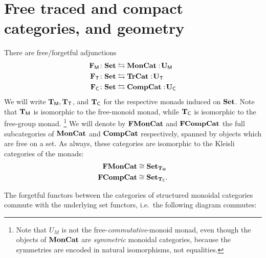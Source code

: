 \documentclass[12pt,oneside,article,draft]{memoir}
\begin{document}
\section{Free traced and compact categories, and geometry}\label{sec:free_and_geometry}

There are free/forgetful adjunctions
\begin{align*}
   \mathbf{F}_{\mathsf{M}}\colon\mathbf{Set} &\leftrightarrows\mathbf{MonCat}:\!\mathbf{U}_{\mathsf{M}} \\
   \mathbf{F}_{\mathsf{T}}\colon\mathbf{Set} &\leftrightarrows\mathbf{TrCat}:\!\mathbf{U}_{\mathsf{T}} \\
   \mathbf{F}_{\mathsf{C}}\colon\mathbf{Set} &\leftrightarrows\mathbf{CompCat}:\!\mathbf{U}_{\mathsf{C}}
\end{align*}
We will write $\mathbf{T}_{\mathsf{M}}, \mathbf{T}_{\mathsf{T}}$, and $\mathbf{T}_{\mathsf{C}}$ for the respective monads induced on $\mathbf{Set}$. Note that $\mathbf{T}_{\mathsf{M}}$ is
isomorphic to the free-monoid monad, while $\mathbf{T}_{\mathsf{C}}$ is isomorphic to the free-group monad.%
\footnote{Note that $U_M$ is not the free-\emph{commutative}-monoid monad, even though the objects of $\mathbf{MonCat}$ are \emph{symmetric} monoidal categories, because the symmetries are encoded in natural isomorphisms, not equalities.
}
We will denote by $\mathbf{FMonCat}$ and $\mathbf{FCompCat}$ the full subcategories of $\mathbf{MonCat}$ and $\mathbf{CompCat}$
respectively, spanned by objects which are free on a set. As always, these categories are isomorphic
to the Kleisli categories of the monads: 
\begin{align}\label{dia:TMvsFrMonCat}
\mathbf{FMonCat}&\cong\mathbf{Set}_{\mathbf{T}_{\mathsf{M}}}
\\\nonumber
\mathbf{FCompCat}&\cong\mathbf{Set}_{\mathbf{T}_{\mathsf{C}}}.
\end{align}

The forgetful functors between the categories of structured monoidal categories commute with the
underlying set functors, i.e.~the following diagram commutes:
\end{document}
